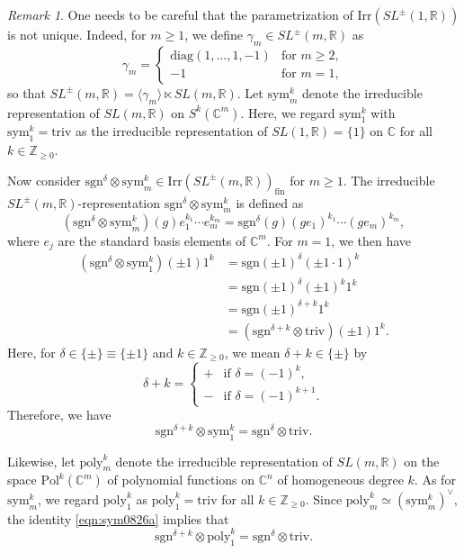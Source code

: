\documentclass[reqno,11pt]{amsart}
\theoremstyle{remark}
\newtheorem{rem}[equation]{Remark}
\theoremstyle{definition}
\numberwithin{equation}{section}
\newcommand{\R}{\mathbb{R}}
\newcommand{\C}{\mathbb{C}}
\newcommand{\Z}{\mathbb{Z}}
\newcommand{\poly}{\mathrm{poly}}
\newcommand{\Irr}{\mathrm{Irr}}
\newcommand{\triv}{\mathrm{triv}}
\newcommand{\fin}{\mathrm{fin}}
\newcommand{\sym}{\mathrm{sym}}
\newcommand{\diag}{\mathrm{diag}}
\newcommand{\sgn}{\mathrm{sgn}}
\begin{document}
\begin{rem}\label{rem:sym}
One needs to be careful 
that the parametrization of  $\Irr(SL^{\pm}(1,\R))$ is not unique.
Indeed, for $m\geq 1$,
we define $\gamma_m \in SL^{\pm}(m,\R)$ as 
\begin{equation*}
\gamma_m= 
\begin{cases}
\diag(1,\ldots,1,-1) & \text{for $m\geq 2$}, \\
-1 &\text{for $m=1$}, 
\end{cases}
\end{equation*}
so that $SL^{\pm}(m,\R) = \langle \gamma_m \rangle \ltimes SL(m,\R)$.
Let $\sym^k_{m}$ denote the irreducible representation of $SL(m,\R)$ on
$S^k(\C^m)$. Here, we regard $\sym^k_1$ with  $\sym^k_1 = \triv$ 
as the irreducible representation of $SL(1,\R) = \{1\}$ on $\C$ 
for all $k \in \Z_{\geq 0}$.

Now consider $\sgn^\delta \otimes \sym^k_m \in \Irr(SL^\pm(m,\R))_{\fin}$ for 
$m\geq 1$. 
The irreducible $SL^{\pm}(m,\R)$-representation
$\sgn^{\delta} \otimes \sym^k_m$ is defined as
\begin{equation*}
(\sgn^\delta\otimes \sym^k_m)(g)e_1^{k_1}\cdots e_m^{k_m}
=\sgn^\delta(g)(ge_1)^{k_1}\cdots (ge_m)^{k_m},
\end{equation*}
where $e_j$ are the standard basis elements of $\C^m$.
For $m=1$, we then have 
\begin{align*}
(\sgn^\delta \otimes \sym^k_1)(\pm 1) 1^k
&=\sgn(\pm 1)^\delta (\pm 1 \cdot 1)^k\\
&=\sgn(\pm 1)^\delta (\pm 1)^k 1^k\\
&=\sgn(\pm 1)^{\delta +k }1^k\\
&=(\sgn^{\delta+k}\otimes \triv)(\pm 1) 1^k.
\end{align*}
Here, 
for $\delta \in \{\pm\}\equiv \{\pm 1\}$ 
and $k \in \Z_{\geq 0}$, we mean 
$\delta + k \in \{\pm\}$ by
\begin{equation*}
\delta+k = 
\begin{cases}
+ & \text{if $\delta = (-1)^k$},\\
- & \text{if $\delta = (-1)^{k+1}$}.
\end{cases}
\end{equation*}
Therefore, we have 
\begin{equation}\label{eqn:sym0826a}
\sgn^{\delta+k} \otimes \sym^k_1 =
\sgn^{\delta}\otimes \triv.
\end{equation}

Likewise, let $\poly^k_{m}$ denote the irreducible representation 
of $SL(m,\R)$ on the space $\text{Pol}^k(\C^m)$ 
of polynomial functions on $\C^n$ of homogeneous degree $k$.
As for $\sym^k_m$, we regard $\poly^k_{1}$ 
as $\poly^k_1 = \triv$ for all $k \in \Z_{\geq 0}$.
Since $\poly^k_m \simeq (\sym^k_m)^\vee$,
the identity \eqref{eqn:sym0826a} implies that
\begin{equation}\label{eqn:poly0826b}
\sgn^{\delta+k} \otimes \poly^k_1 =
\sgn^{\delta}\otimes \triv.
\end{equation}

\end{rem}
\end{document}
